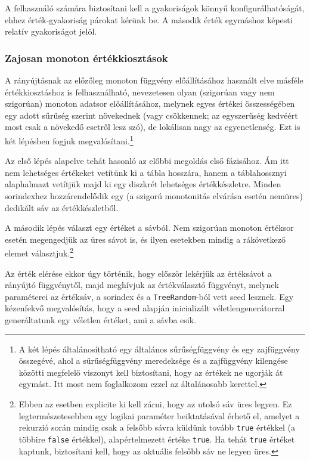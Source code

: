 \documentclass[
    parspace,
    noindent,
    nohyp,
]{elteiktdk}[2023/04/10]
\begin{document}
A felhasználó számára biztosítani kell a gyakoriságok könnyű konfigurálhatóságát,
ehhez érték-gyakoriság párokat kérünk be.
A második érték egymáshoz képesti relatív gyakoriságot jelöl.

\subsubsection{Zajosan monoton értékkiosztások}

A rányújtásnak az előzőleg monoton függvény előállításához használt elve
másféle értékkiosztáshoz is felhasználható,
nevezetesen olyan (szigorúan vagy nem szigorúan) monoton adatsor előállításához,
melynek egyes értékei összességében egy adott sűrűség szerint növekednek
(vagy csökkennek; az egyszerűség kedvéért most csak a növekedő esetről lesz szó),
de lokálisan nagy az egyenetlenség.
Ezt is két lépésben fogjuk megvalósítani.\footnote{
  A két lépés általánosítható egy általános sűrűségfüggvény és egy zajfüggvény összegévé,
  ahol a sűrűségfüggvény meredeksége és a zajfüggvény kilengése közötti megfelelő viszonyt kell biztosítani,
  hogy az értékek ne ugorják át egymást.
  Itt most nem foglalkozom ezzel az általánosabb kerettel.
}

Az első lépés alapelve tehát hasonló az előbbi megoldás első fázisához.
Ám itt nem lehetséges értékeket vetítünk ki a tábla hosszára,
hanem a táblahossznyi alaphalmazt vetítjük majd ki egy diszkrét lehetséges értékkészletre.
Minden sorindexhez hozzárendelődik egy (a szigorú monotonitás elvárása esetén nemüres)
dedikált sáv az értékkészletből.

A második lépés választ egy értéket a sávból.
Nem szigorúan monoton értéksor esetén megengedjük az üres sávot is,
és ilyen esetekben mindig a rákövetkező elemet választjuk.\footnote{
  Ebben az esetben explicite ki kell zárni, hogy az utolsó sáv üres legyen.
  Ez legtermészetesebben egy logikai paraméter beiktatásával érhető el,
  amelyet a rekurzió során mindig csak a felsőbb sávra küldünk tovább \texttt{true} értékkel
  (a többire \texttt{false} értékkel),
  alapértelmezett értéke \texttt{true}.
  Ha tehát \texttt{true} értéket kaptunk, biztosítani kell, hogy az aktuális felsőbb sáv ne legyen üres.
}

Az érték elérése ekkor úgy történik, hogy először lekérjük az értéksávot a rányújtó függvénytől,
majd meghívjuk az értékválasztó függvényt,
melynek paraméterei az értéksáv, a sorindex és a \texttt{TreeRandom}-ból vett seed lesznek.
Egy kézenfekvő megvalósítás,
hogy a seed alapján inicializált véletlengenerátorral
generáltatunk egy véletlen értéket, ami a sávba esik.
\end{document}
